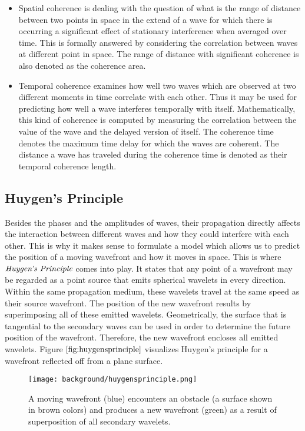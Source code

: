 \begin{itemize}
  \item Spatial coherence is dealing with the question of what is the range of distance between two points in space in the extend of a wave for which there is occurring a significant effect of stationary interference when averaged over time. This is formally answered by considering the correlation between waves at different point in space. The range of distance with significant coherence is also denoted as the coherence area.
  \item Temporal coherence examines how well two waves which are observed at two different moments in time correlate with each other. Thus it may be used for predicting how well a wave interferes temporally with itself. Mathematically, this kind of coherence is computed by measuring the correlation between the value of the wave and the delayed version of itself. The coherence time denotes the maximum time delay for which the waves are coherent. The distance a wave has traveled during the coherence time is denoted as their temporal coherence length.
\end{itemize}


\subsection{Huygen's Principle}
\label{sec:huygensprincipledef}
Besides the phases and the amplitudes of waves, their propagation directly affects the interaction between different waves and how they could interfere with each other. This is why it makes sense to formulate a model which allows us to predict the position of a moving wavefront and how it moves in space. This is where $\emph{Huygen's Principle}$ comes into play. It states that any point of a wavefront may be regarded as a point source that emits spherical wavelets in every direction. Within the same propagation medium, these wavelets travel at the same speed as their source wavefront. The position of the new wavefront results by superimposing all of these emitted wavelets. Geometrically, the surface that is tangential to the secondary waves can be used in order to determine the future position of the wavefront. Therefore, the new wavefront encloses all emitted wavelets. Figure $\ref{fig:huygensprinciple}$ visualizes Huygen's principle for a wavefront reflected off from a plane surface.

\begin{figure}[H]
  \centering
  \texttt{[image: background/huygensprinciple.png]}
  \caption[Huygen's Principle]{A moving wavefront (blue) encounters an obstacle (a surface shown in brown colors) and produces a new wavefront (green) as a result of superposition of all secondary wavelets.}
  \label{fig:huygensprinciple}
\end{figure}

